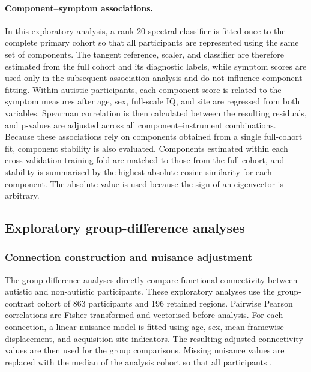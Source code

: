 \paragraph{\textbf{Component--symptom associations.}}
\label{par:component-symptom}
In this exploratory analysis, a rank-20 spectral classifier is fitted once to the complete primary cohort so that all participants are represented using the same set of components. The tangent reference, scaler, and classifier are therefore estimated from the full cohort and its diagnostic labels, while symptom scores are used only in the subsequent association analysis and do not influence component fitting. Within autistic participants, each component score is related to the symptom measures after age, sex, full-scale IQ, and site are regressed from both variables. Spearman correlation is then calculated between the resulting residuals, and p-values are adjusted across all component--instrument combinations. Because these associations rely on components obtained from a single full-cohort fit, component stability is also evaluated. Components estimated within each cross-validation training fold are matched to those from the full cohort, and stability is summarised by the highest absolute cosine similarity for each component. The absolute value is used because the sign of an eigenvector is arbitrary.

\subsection{Exploratory group-difference analyses}
\label{subsec:group-differences}

\subsubsection{Connection construction and nuisance adjustment}
\label{subsubsec:connection-adjustment}

The group-difference analyses directly compare functional connectivity between autistic and non-autistic participants. These exploratory analyses use the group-contrast cohort of 863 participants and 196 retained regions. Pairwise Pearson correlations are Fisher transformed and vectorised before analysis. For each connection, a linear nuisance model is fitted using age, sex, mean framewise displacement, and acquisition-site indicators. The resulting adjusted connectivity values are then used for the group comparisons. Missing nuisance values are replaced with the median of the analysis cohort so that all participants .


